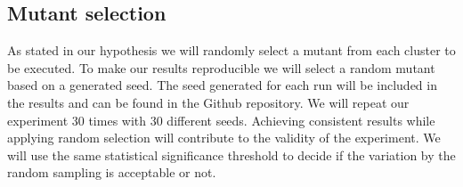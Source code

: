 \documentclass[../../main]{subfiles}
\begin{document}
\subsection{Mutant selection}
As stated in our hypothesis we will randomly select a mutant from each cluster to be executed.
To make our results reproducible we will select a random mutant based on a generated seed.
The seed generated for each run will be included in the results and can be found in the Github repository\cite{rbasarat-repo}.
We will repeat our experiment 30 times with 30 different seeds.
Achieving consistent results while applying random selection will contribute to the validity of the experiment.
We will use the same statistical significance threshold to decide if the variation by the random sampling is acceptable or not.
\end{document}
